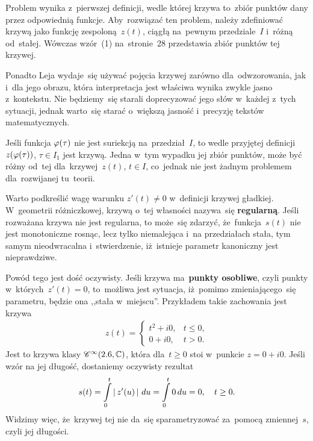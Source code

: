 \documentclass[a4paper,11pt]{article}
\begin{document}
Problem wynika z~pierwszej definicji, wedle której krzywa to~zbiór
punktów dany przez odpowiednią funkcje. Aby~rozwiązać ten problem,
należy zdefiniować krzywą jako funkcję zespoloną~$z( t )$, ciągłą
na~pewnym przedziale~$I$ i~różną od~stałej. Wówczas wzór~(1)
na~stronie~28 przedstawia zbiór punktów tej krzywej.

Ponadto Leja wydaje~się używać pojęcia krzywej zarówno
dla~odwzorowania, jak i~dla jego obrazu, która interpretacja jest
właściwa wynika zwykle jasno z~kontekstu. Nie będziemy~się starali
doprecyzować jego słów w~każdej z~tych sytuacji, jednak warto~się
starać o~większą jasność i~precyzję tekstów matematycznych.

\vspace{\spaceFour}


\start {} Jeśli funkcja $\varphi( \tau )$ nie jest suriekcją
na~przedział~$I$, to wedle przyjętej definicji~$z( \varphi( \tau ) )$,
$\tau \in I_{ 1 }$ jest krzywą. Jedna w~tym wypadku jej zbiór punktów,
może być różny od~tej dla~krzywej~$z( t )$, $t \in I$, co~jednak nie
jest żadnym problemem dla~rozwijanej tu~teorii.

\vspace{\spaceFour}


\start {} Warto podkreślić wagę warunku $z'( t ) \neq 0$
w~definicji krzywej gładkiej. W~geometrii różniczkowej, krzywą o~tej
własności nazywa~się \textbf{regularną}. Jeśli rozważana krzywa nie
jest regularna, to może~się zdarzyć, że~funkcja~$s( t )$ nie jest
monotoniczne rosnąc, lecz tylko niemalejąca i~na przedziałach stała,
tym samym nieodwracalna i~stwierdzenie, iż~istnieje parametr
kanoniczny jest nieprawdziwe.

Powód tego jest dość oczywisty. Jeśli krzywa ma~\textbf{punkty
  osobliwe}, czyli punkty w~których~$z'( t ) = 0$, to~możliwa jest
sytuacja, iż~pomimo zmieniającego~się parametru, będzie ona ,,stała
w~miejscu''. Przykładem takie zachowania jest krzywa
\begin{equation}
  \label{eq:Leja-28}
  \begin{split}
    z( t ) =
    \begin{cases}
      t^{ 2 } + i 0, & t \leq 0, \\
      0 + i 0, & t > 0.
    \end{cases}
  \end{split}
\end{equation}
Jest to krzywa klasy $\mathcal{C}^{ \infty }( 2.6, \mathbb{C} )$, która dla~$t \geq 0$ stoi
w~punkcie $z = 0 + i 0$. Jeśli wzór na jej długość, dostaniemy
oczywisty rezultat
\begin{equation}
  \label{eq:Leja-29}
  \begin{split}
    s( t ) = \int\limits_{ 0 }^{ t } \left| \,  z'( u )  \, \right| \, du = \int\limits_{ 0 }^{ t
    } 0 \, du = 0, \quad t \geq 0.
  \end{split}
\end{equation}
Widzimy więc, że~krzywej tej nie da~się sparametryzować za~pomocą
zmiennej~$s$, czyli jej długości.
\end{document}
